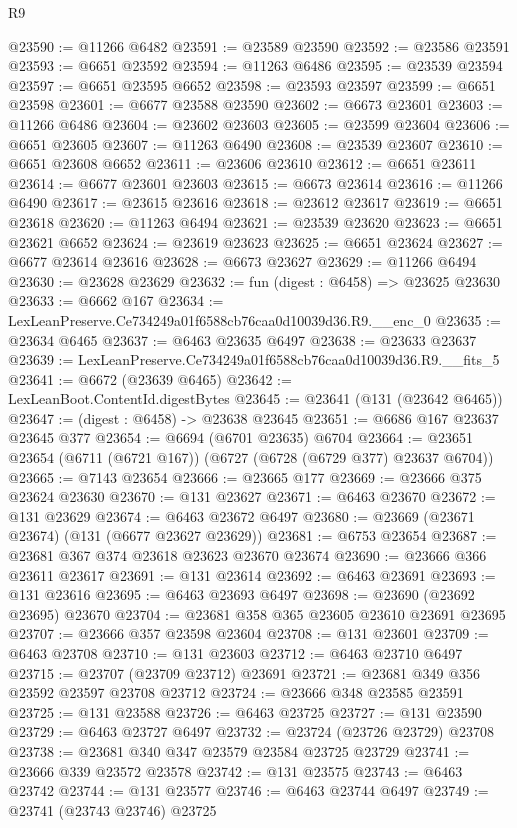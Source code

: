 \begin{lexlean}{R9}
\begin{coremodule}
@23590 := @11266 @6482
@23591 := @23589 @23590
@23592 := @23586 @23591
@23593 := @6651 @23592
@23594 := @11263 @6486
@23595 := @23539 @23594
@23597 := @6651 @23595 @6652
@23598 := @23593 @23597
@23599 := @6651 @23598
@23601 := @6677 @23588 @23590
@23602 := @6673 @23601
@23603 := @11266 @6486
@23604 := @23602 @23603
@23605 := @23599 @23604
@23606 := @6651 @23605
@23607 := @11263 @6490
@23608 := @23539 @23607
@23610 := @6651 @23608 @6652
@23611 := @23606 @23610
@23612 := @6651 @23611
@23614 := @6677 @23601 @23603
@23615 := @6673 @23614
@23616 := @11266 @6490
@23617 := @23615 @23616
@23618 := @23612 @23617
@23619 := @6651 @23618
@23620 := @11263 @6494
@23621 := @23539 @23620
@23623 := @6651 @23621 @6652
@23624 := @23619 @23623
@23625 := @6651 @23624
@23627 := @6677 @23614 @23616
@23628 := @6673 @23627
@23629 := @11266 @6494
@23630 := @23628 @23629
@23632 := fun (digest : @6458) => @23625 @23630
@23633 := @6662 @167
@23634 := LexLeanPreserve.Ce734249a01f6588cb76caa0d10039d36.R9.__enc_0
@23635 := @23634 @6465
@23637 := @6463 @23635 @6497
@23638 := @23633 @23637
@23639 := LexLeanPreserve.Ce734249a01f6588cb76caa0d10039d36.R9.__fits_5
@23641 := @6672 (@23639 @6465)
@23642 := LexLeanBoot.ContentId.digestBytes
@23645 := @23641 (@131 (@23642 @6465))
@23647 := (digest : @6458) -> @23638 @23645
@23651 := @6686 @167 @23637 @23645 @377
@23654 := @6694 (@6701 @23635) @6704
@23664 := @23651 @23654 (@6711 (@6721 @167)) (@6727 (@6728 (@6729 @377) @23637 @6704))
@23665 := @7143 @23654
@23666 := @23665 @177
@23669 := @23666 @375 @23624 @23630
@23670 := @131 @23627
@23671 := @6463 @23670
@23672 := @131 @23629
@23674 := @6463 @23672 @6497
@23680 := @23669 (@23671 @23674) (@131 (@6677 @23627 @23629))
@23681 := @6753 @23654
@23687 := @23681 @367 @374 @23618 @23623 @23670 @23674
@23690 := @23666 @366 @23611 @23617
@23691 := @131 @23614
@23692 := @6463 @23691
@23693 := @131 @23616
@23695 := @6463 @23693 @6497
@23698 := @23690 (@23692 @23695) @23670
@23704 := @23681 @358 @365 @23605 @23610 @23691 @23695
@23707 := @23666 @357 @23598 @23604
@23708 := @131 @23601
@23709 := @6463 @23708
@23710 := @131 @23603
@23712 := @6463 @23710 @6497
@23715 := @23707 (@23709 @23712) @23691
@23721 := @23681 @349 @356 @23592 @23597 @23708 @23712
@23724 := @23666 @348 @23585 @23591
@23725 := @131 @23588
@23726 := @6463 @23725
@23727 := @131 @23590
@23729 := @6463 @23727 @6497
@23732 := @23724 (@23726 @23729) @23708
@23738 := @23681 @340 @347 @23579 @23584 @23725 @23729
@23741 := @23666 @339 @23572 @23578
@23742 := @131 @23575
@23743 := @6463 @23742
@23744 := @131 @23577
@23746 := @6463 @23744 @6497
@23749 := @23741 (@23743 @23746) @23725

\end{coremodule}
\end{lexlean}
